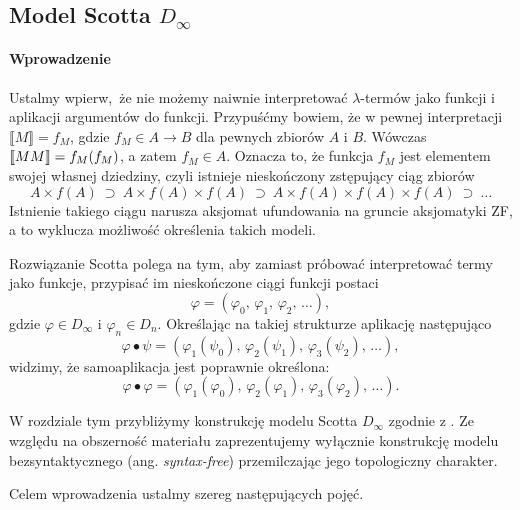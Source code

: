 \subsection{Model Scotta \(D_\infty\)}
\paragraph{Wprowadzenie}
Ustalmy wpierw, że nie możemy naiwnie interpretować \(\lambda\)-termów jako funkcji i aplikacji argumentów do funkcji. Przypuśćmy bowiem, że w pewnej interpretacji \(\llbracket M \rrbracket=f_M\), gdzie \(f_M \in A\to B\) dla pewnych zbiorów \(A\) i \(B\). Wówczas \(\llbracket M M\rrbracket=\nobreak f_M(f_M)\), a zatem \(f_M\in A\). Oznacza to, że funkcja \(f_M\) jest elementem swojej własnej dziedziny, czyli istnieje nieskończony zstępujący ciąg zbiorów \[A\times f(A)\ \supset\ A\times f(A)\times f(A)\ \supset\ A\times f(A)\times f(A)\times f(A)\ \supset\ \dots\] Istnienie takiego ciągu narusza aksjomat ufundowania na gruncie aksjomatyki ZF, a to wyklucza możliwość określenia takich modeli.

Rozwiązanie Scotta polega na tym, aby zamiast próbować interpretować termy jako funkcje, przypisać im nieskończone ciągi funkcji postaci 
\[
  \varphi = (\varphi_0,\,\varphi_1,\,\varphi_2,\,\dots),
\]
gdzie \(\varphi \in D_\infty\) i \(\varphi_n\in D_n\). Określając na takiej strukturze aplikację następująco
\[
  \varphi\bullet\psi = (\varphi_1(\psi_0),\,\varphi_2(\psi_1),\,\varphi_3(\psi_2),\,\dots),
\]
widzimy, że samoaplikacja jest poprawnie określona: 
\[
  \varphi\bullet\varphi = (\varphi_1(\varphi_0),\,\varphi_2(\varphi_1),\,\varphi_3(\varphi_2),\,\dots).
\]

W rozdziale tym przybliżymy konstrukcję modelu Scotta \(D_\infty\) zgodnie z \cite[Rozdział 16]{Hindley:2008:LCI:1388400}. Ze względu na obszerność materiału zaprezentujemy wyłącznie konstrukcję modelu bezsyntaktycznego (ang. \emph{syntax-free}) przemilczając jego topologiczny charakter. %

Celem wprowadzenia ustalmy szereg następujących pojęć.

